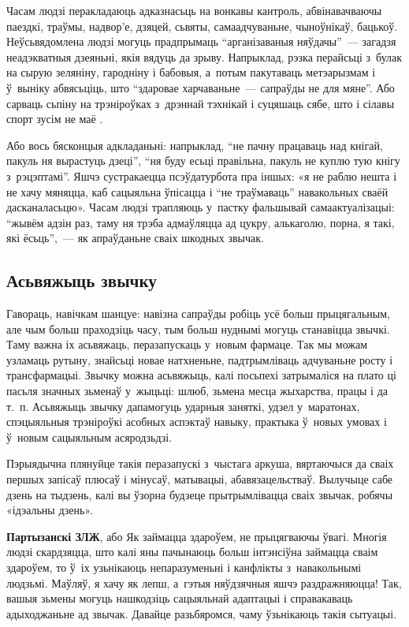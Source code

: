 Часам людзі перакладаюць адказнасьць на вонкавы кантроль, абвінавачваючы паездкі, траўмы, надвор'е, дзяцей, сьвяты, самаадчуваньне, чыноўнікаў, бацькоў. Неўсьвядомлена людзі могуць прадпрымаць ``арганізаваныя няўдачы''~--- загадзя неадэкватныя дзеяньні, якія вядуць да зрыву. Напрыклад, рэзка перайсьці з~булак на сырую зеляніну, гародніну і бабовыя, а~потым пакутаваць метэарызмам і ў~выніку абвясьціць, што ``здаровае харчаваньне~--- сапраўды не для мяне''. Або сарваць сьпіну на трэніроўках з~дрэннай тэхнікай і суцяшаць сябе, што і сілавы спорт зусім не маё .

Або вось бясконцыя адкладаньні: напрыклад, ``не пачну працаваць над кнігай, пакуль ня вырастуць дзеці'', ``ня буду есьці правільна, пакуль не куплю тую кнігу з~рэцэптамі''. Яшчэ сустракаецца псэўдатурбота пра іншых: «я не раблю нешта і не хачу мяняцца, каб сацыяльна ўпісацца і ``не траўмаваць'' навакольных сваёй дасканаласьцю». Часам людзі трапляюць у~пастку фальшывай самаактуалізацыі: ``жывём адзін раз, таму ня трэба адмаўляцца ад цукру, алькаголю, порна, я такі, які ёсьць'',~--- як апраўданьне сваіх шкодных звычак.

\subsection*{Асьвяжыць звычку}

Гавораць, навічкам шанцуе: навізна сапраўды робіць усё больш прыцягальным, але чым больш праходзіць часу, тым больш нуднымі могуць станавіцца звычкі. Таму важна іх асьвяжаць, перазапускаць у~новым фармаце. Так мы можам узламаць рутыну, знайсьці новае натхненьне, падтрымліваць адчуваньне росту і трансфармацыі. Звычку можна асьвяжыць, калі посьпехі затрымаліся на плато ці пасьля значных зьменаў у~жыцьці: шлюб, зьмена месца жыхарства, працы і да т.~п. Асьвяжыць звычку дапамогуць ударныя заняткі, удзел у~маратонах, спэцыяльныя трэніроўкі асобных аспэктаў навыку, практыка ў~новых умовах і ў~новым сацыяльным асяродзьдзі.

Пэрыядычна плянуйце такія перазапускі з~чыстага аркуша, вяртаючыся да сваіх першых запісаў плюсаў і мінусаў, матывацыі, абавязацельстваў. Вылучыце сабе дзень на тыдзень, калі вы ўзорна будзеце прытрымлівацца сваіх звычак, робячы «ідэальны дзень».

\textbf{Партызанскі ЗЛЖ}, або Як займацца здароўем, не прыцягваючы ўвагі. Многія людзі скардзяцца, што калі яны пачынаюць больш інтэнсіўна займацца сваім здароўем, то ў~іх узьнікаюць непаразуменьні і канфлікты з~навакольнымі людзьмі. Маўляў, я хачу як лепш, а~гэтыя няўдзячныя яшчэ раздражняюцца! Так, вашыя зьмены могуць нашкодзіць сацыяльнай адаптацыі і справакаваць адыходжаньне ад звычак. Давайце разьбяромся, чаму ўзьнікаюць такія сытуацыі.

